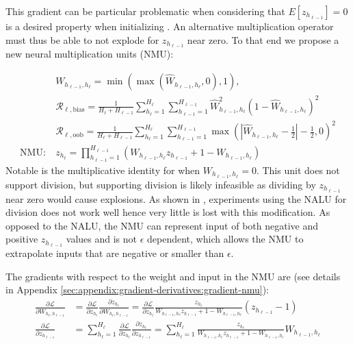 This gradient can be particular problematic when considering that $E[z_{h_{\ell-1}}] = 0$ is a desired property when initializing \cite{glorot-initialization}. An alternative multiplication operator must thus be able to not explode for $z_{h_{\ell-1}}$ near zero. To that end we propose a new neural multiplication units (NMU):

\begin{equation}
\begin{aligned}
&W_{h_{\ell-1},h_\ell} = \min(\max(\hat{W}_{h_{\ell-1},h_\ell}, 0), 1), \\
&\mathcal{R}_{\ell,\mathrm{bias}} = \frac{1}{H_\ell + H_{\ell-1}} \sum_{h_\ell=1}^{H_\ell} \sum_{h_{\ell-1}=1}^{H_{\ell-1}} \hat{W}_{h_{\ell-1},h_\ell}^2 (1 - \hat{W}_{h_{\ell-1},h_\ell})^2 \\
&\mathcal{R}_{\ell,\mathrm{oob}} = \frac{1}{H_\ell + H_{\ell-1}} \sum_{h_\ell=1}^{H_\ell} \sum_{h_{\ell-1}=1}^{H_{\ell-1}} \max\left(\left|\hat{W}_{h_{\ell-1},h_\ell} - \frac{1}{2}\right| - \frac{1}{2}, 0\right)^2 \\
\textrm{NMU}:\ &z_{h_\ell} = \prod_{h_{\ell-1}=1}^{H_{\ell-1}} \left(W_{h_{\ell-1},h_\ell} z_{h_{\ell-1}} + 1 - W_{h_{\ell-1},h_\ell} \right)
\end{aligned}
\end{equation}
Notable is the multiplicative identity for when $W_{h_{\ell-1},h_\ell}=0$.
This unit does not support division, but supporting division is likely infeasible as dividing by $z_{h_{\ell-1}}$ near zero would cause explosions.
As shown in \cite{trask-nalu}, experiments using the NALU for division does not work well hence very little is lost with this modification.
As opposed to the NALU, the NMU can represent input of both negative and positive $z_{h_{\ell-1}}$ values and is not $\epsilon$ dependent, which allows the NMU to extrapolate inputs that are negative or smaller than $\epsilon$.

The gradients with respect to the weight and input in the NMU are (see details in Appendix \ref{sec:appendix:gradient-derivatives:gradient-nmu}):
\begin{equation}
\begin{aligned}
\frac{\partial \mathcal{L}}{\partial W_{h_{\ell}, h_{\ell - 1}}} &= \frac{\partial \mathcal{L}}{\partial z_{h_\ell}} \frac{\partial z_{h_\ell}}{\partial W_{h_{\ell}, h_{\ell - 1}}} = \frac{\partial \mathcal{L}}{\partial z_{h_\ell}} \frac{z_{h_\ell}}{W_{h_{\ell-1},h_\ell} z_{h_{\ell-1}} + 1 - W_{h_{\ell-1},h_\ell}} \left(z_{h_{\ell-1}} - 1\right) \\
\frac{\partial \mathcal{L}}{\partial z_{h_{\ell-1}}} &= \sum_{h_\ell = 1}^{H_\ell} \frac{\partial \mathcal{L}}{\partial z_{h_\ell}} \frac{\partial z_{h_\ell}}{\partial z_{h_{\ell-1}}} = \sum_{h_\ell = 1}^{H_\ell} \frac{z_{h_\ell}}{W_{h_{\ell-1},h_\ell} z_{h_{\ell-1}} + 1 - W_{h_{\ell-1},h_\ell}} W_{h_{\ell-1},h_\ell}
\end{aligned}
\end{equation}

